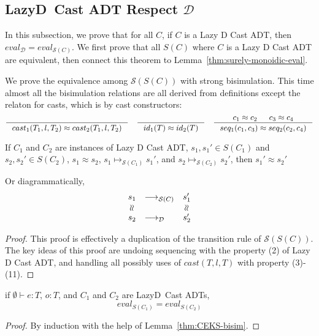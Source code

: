 \documentclass[acmsmall,review,anonymous]{acmart}\settopmatter{printfolios=true,printccs=false,printacmref=false}
\newcommand{\judgetype}[3]{#1 \vdash #2 : #3}
\newcommand{\lazyD}{Lazy\;D}
\newcommand{\judgeSreduce}[3]{#2 \longmapsto_{\mathcal{S}(#1)} #3}
\newcommand{\ineffCEKD}{$\mathcal{D}$}
\newcommand{\effCEK}[1]{$\mathcal{S}(#1)$}
\newcommand{\evalEqv}[2]{$eval_{\text{#1}} = eval_{\text{#2}}$}
\begin{document}
\subsection{\lazyD\ Cast ADT Respect \ineffCEKD}
\label{secc:framework:all-correct}

In this subsection, we prove that for all $C$, if $C$ is a Lazy D Cast ADT, 
then \evalEqv{\ineffCEKD}{\effCEK{C}}. We first 
prove that all $S(C)$ where $C$ is a Lazy D Cast ADT are equivalent, then 
connect this theorem to Lemma~\ref{thm:surely-monoidic-eval}.

We prove the equivalence among \effCEK{S(C)} with strong bisimulation. This 
time almost all the bisimulation relations are all derived from definitions 
except the relaton for casts, which is by cast constructors:
\begin{gather*}
\inference{
}{
	cast_1(T_1,l,T_2) \approx cast_2(T_1,l,T_2)
}
\quad
\inference{
}{
	id_1(T) \approx id_2(T)
}
\quad
\inference{
	c_1 \approx c_2 &
	c_3 \approx c_4
}{
	seq_1(c_1,c_3) \approx seq_2(c_2,c_4)
}
\end{gather*}

\begin{lemma}
	\label{thm:CEKS-bisim}
	If 
	$C_1$ and $C_2$ are instances of Lazy D Cast ADT,
	$s_1, s_1' \in S(C_1)$ and $s_2,s_2' \in S(C_2)$,
	$s_1 \approx s_2$,
	$\judgeSreduce{C_1}{s_1}{s_1'}$, and
	$\judgeSreduce{C_2}{s_2}{s_2'}$, then 
	$s_1' \approx s_2'$
	
	Or diagrammatically, 
	\[\begin{array}{clc}
	s_{1} & \longrightarrow_{\text{\effCEK{C}}} & s_1'\\
	\rotatebox[origin=c]{90}{$\approx$} 
	& & \rotatebox[origin=c]{90}{$\approx$} \\
	s_{2} & 
	\longrightarrow_{\text{\ineffCEKD}} & s_2' \\
	\end{array}\]
\end{lemma}
\begin{proof} 
	This proof is effectively a duplication of the transition rule of 
	\effCEK{S(C)}.
	The key ideas of this proof are undoing sequencing with the property (2) of 
	Lazy D Cast ADT, and handling all possibly uses of $
	cast(T,l,T)$ with property (3)-(11).
\end{proof}

\begin{proposition}[Equivalence of \lazyD{} Cast ADT]
	\label{thm:surely-lazyD-eqv}
	if $\judgetype{\emptyset}{e}{T}$, $o : T$, and $C_1$ and $C_2$
	are \lazyD\ Cast ADTs,
	\[
	eval_{S(C_1)} = eval_{S(C_2)}
	\]
\end{proposition}
\begin{proof}
	By induction with the help of Lemma~\ref{thm:CEKS-bisim}.
\end{proof}
\end{document}
